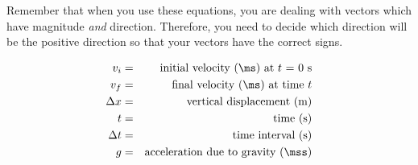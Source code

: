 Remember that when you use these equations, you are dealing with vectors which have magnitude \textit{and} direction. Therefore, you need to decide which direction will be the positive direction so that your vectors have the correct signs. 

\begin{eqnarray*}
v_i &=& \mbox{initial velocity (\ms) at $t$ = 0 s} \\
v_f &=& \mbox{final velocity (\ms) at time $t$}\\
\Delta x &=& \mbox{vertical displacement (m)} \\
t &=& \mbox{time (s)} \\
\Delta t &=& \mbox{time interval (s)} \\
g &=& \mbox{acceleration due to gravity (\mss)}
\end{eqnarray*}

